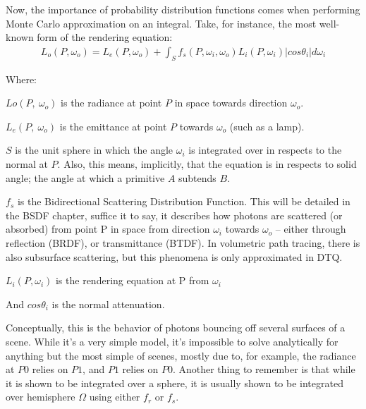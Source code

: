 \documentclass{article}
\begin{document}
    
  
  Now, the importance of probability distribution functions comes when
performing Monte Carlo approximation on an integral. Take, for instance, the
most well-known form of the rendering equation:
  \begin{align}
    L_o(P, \omega_o) = L_e(P, \omega_o) + \int_{S}f_s(P, \omega_i,
    \omega_o) L_i(P, \omega_i) \vert cos\theta_i\vert d\omega_i
  \end{align}
  
  Where:
  \begin{list}{}{}
  	 \item $Lo(P,\:\omega_o)$ is the radiance at point $P$ in space towards direction $\omega_o$. 
  	 
  	 \item $L_e(P,\:\omega_o)$ is the emittance at point $P$ towards $\omega_o$
      (such as a lamp).
  	 
  	 
  	 \item $S$ is the unit sphere in which the angle $\omega_i$ is integrated
        over in respects to the normal at $P$. Also, this means, implicitly,
        that the equation is in respects to solid angle; the angle at which a
        primitive $A$ subtends $B$.
  	 
  	 \item $f_s$ is the Bidirectional Scattering Distribution Function. This
        will be detailed in the BSDF chapter, suffice it to say, it describes
        how photons are scattered (or absorbed) from point P in space from
        direction $\omega_i$ towards $\omega_o$ -- either through reflection
        (BRDF), or transmittance (BTDF). In volumetric path tracing, there is
        also subsurface scattering, but this phenomena is only approximated in
        DTQ.
  	 
  	 \item $L_i(P, \omega_i)$ is the rendering equation at P from $\omega_i$
  	 
  	 \item And $cos\theta_i$ is the normal attenuation.
  \end{list}
  Conceptually, this is the behavior of photons bouncing off several surfaces of
a scene. While it's a very simple model, it's impossible to solve analytically
for anything but the most simple of scenes, mostly due to, for example, the
radiance at $P0$ relies on $P1$, and $P1$ relies on $P0$. Another thing to
remember is that while it is shown to be integrated over a sphere, it is usually
shown to be integrated over hemisphere $\Omega$ using either $f_r$ or $f_s$.
  
\end{document}

